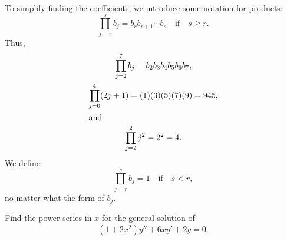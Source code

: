 To simplify
finding the coefficients, we introduce some notation for
products:
\[
\prod^s_{j=r}b_j=b_rb_{r+1}\cdots b_s\quad \text{if}\quad s\ge r.
\]
Thus,
\begin{gather*}
\prod^7_{j=2}b_j=b_2b_3b_4b_5b_6b_7,\\
\prod^4_{j=0}(2j+1)=(1)(3)(5)(7)(9)=945,\\
\shortintertext{and}
\prod^2_{j=2}j^2=2^2=4.
\end{gather*}
We define
\[
\prod^s_{j=r}b_j=1\quad \text{if}\quad s < r,
\]
no matter what the form of $b_j$.

\begin{example}\label{example:7.2.2}
Find the power series in $x$ for the general solution of
\begin{equation}\label{eq:7.2.17}
 (1+2x^2)y''+6xy'+2y=0.
\end{equation}
\end{example}

